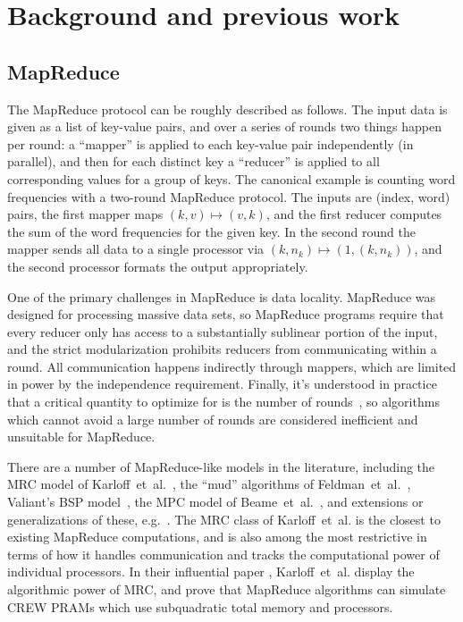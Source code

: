 \documentclass[11pt]{article}
\theoremstyle{definition}
\theoremstyle{remark}
\begin{document}
\section{Background and previous work}

\subsection{MapReduce}

The MapReduce protocol can be roughly described as follows. The input data is
given as a list of key-value pairs, and over a series of rounds two things
happen per round: a ``mapper'' is applied to each key-value pair independently
(in parallel), and then for each distinct key a ``reducer'' is applied to all
corresponding values for a group of keys. The canonical example is counting
word frequencies with a two-round MapReduce protocol. The inputs are (index,
word) pairs, the first mapper maps $(k,v) \mapsto (v,k)$, and the first reducer
computes the sum of the word frequencies for the given key. In the second round
the mapper sends all data to a single processor via $(k, n_k) \mapsto (1, (k,
n_k))$, and the second processor formats the output appropriately.

One of the primary challenges in MapReduce is data locality. MapReduce was
designed for processing massive data sets, so MapReduce programs require that
every reducer only has access to a substantially sublinear portion of the
input, and the strict modularization prohibits reducers from communicating
within a round. All communication happens indirectly through mappers, which are
limited in power by the independence requirement. Finally, it's understood in
practice that a critical quantity to optimize for is the number of
rounds~\cite{Karloff10}, so algorithms which cannot avoid a large number of
rounds are considered inefficient and unsuitable for MapReduce.

There are a number of MapReduce-like models in the literature, including the
MRC model of Karloff~et~al.~\cite{Karloff10}, the ``mud'' algorithms of
Feldman~et~al.~\cite{FeldmanMSSS10}, Valiant's BSP model~\cite{Valiant90}, the
MPC model of Beame~et~al.~\cite{BeameKS13}, and extensions or generalizations
of these, e.g.~\cite{GoodrichSZ11}. The MRC class of Karloff~et~al. is the
closest to existing MapReduce computations, and is also among the most restrictive in
terms of how it handles communication and tracks the computational power of
individual processors. In their influential paper \cite{Karloff10},
Karloff~et~al. display the algorithmic power of MRC, and prove that MapReduce
algorithms can simulate CREW PRAMs which use subquadratic total memory and
processors.
\end{document}
